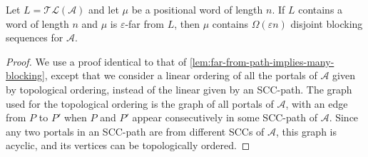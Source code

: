 \documentclass[letterpaper, USenglish, cleveref, autoref, thm-restate, numberwithinsect]{lipics-v2021}
\theoremstyle{theorem}
\theoremstyle{definition}
\newcommand{\Aa}{\mathcal{A}}
\newcommand{\eps}{\varepsilon}
\newcommand{\timedlang}[1]{\mathcal{TL}( #1 )}
\begin{document}
\begin{corollary}\label{cor:far-L-many-bs}
	Let $L = \timedlang{\Aa}$ and let $\mu$ be a positional word of length $n$.
	If $L$ contains a word of length $n$ and $\mu$ is $\eps$-far from $L$,
	then $\mu$ contains $\Omega(\eps n)$ disjoint blocking sequences for $\Aa$.
\end{corollary}
\begin{proof}
	We use a proof identical to that of \cref{lem:far-from-path-implies-many-blocking}, except that we consider a linear ordering of all the portals of $\Aa$ given by topological ordering, instead of the linear given by an SCC-path.
	The graph used for the topological ordering is the graph of all portals of $\Aa$, with an edge from $P$ to $P'$ when $P$ and $P'$ appear consecutively in some SCC-path of $\Aa$.
	Since any two portals in an SCC-path are from different SCCs of $\Aa$, this graph is acyclic, and its vertices can be topologically ordered.
\end{proof}
\end{document}
